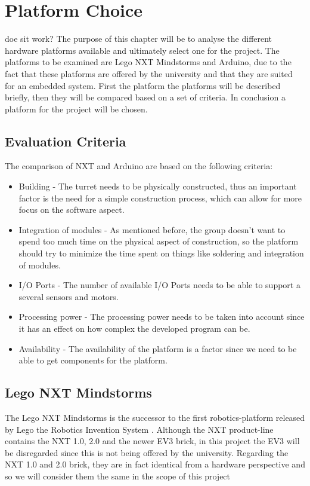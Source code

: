 \chapter{Platform Choice}\label{PlatformC}
doe sit work?
The purpose of this chapter will be to analyse the different hardware platforms available
and ultimately select one for the project. The platforms to be examined are Lego
NXT Mindstorms and Arduino, due to the fact that these platforms are offered by
the university and that they are suited for an embedded system.
First the platform the platforms will be described briefly, then they will be
compared based on a set of criteria. In conclusion a platform for the project
will be chosen.

\section{Evaluation Criteria}
The comparison of NXT and Arduino are based on the following criteria:

\begin{itemize}
  \item Building - The turret needs to be physically constructed, thus an
  important factor is the need for a simple construction process, which can
  allow for more focus on the software aspect.
  \item Integration of modules - As mentioned before, the group doesn't want to spend too
  much time on the physical aspect of construction, so the platform should try to minimize
  the time spent on things like soldering and integration of modules.
  \item I/O Ports - The number of available I/O Ports needs to be able to
  support a several sensors and motors.
  \item Processing power - The processing power needs to be taken into account
  since it has an effect on how complex the developed program can be.
  \item Availability - The availability of the platform is a factor since we
  need to be able to get components for the platform.
\end{itemize}

\section{Lego NXT Mindstorms}
The Lego NXT Mindstorms is the successor to the first robotics-platform released
by Lego the Robotics Invention System \citep{NXTHistory}. Although the NXT
product-line contains the NXT 1.0, 2.0 and the newer EV3 brick, in this project
the EV3 will be disregarded since this is not being offered by the university.
Regarding the NXT 1.0 and 2.0 brick, they are in fact identical from a hardware
perspective and so we will consider them the same in the scope of this project
\citep{NXTversions}\nl

